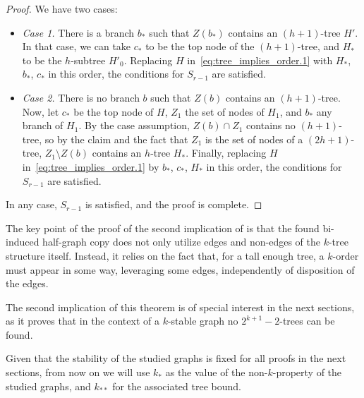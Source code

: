 \begin{theorem}
\begin{proof}
                We have two cases:
                \begin{itemize}
                    \item \emph{Case 1.} There is a branch $b_*$ such that $Z(b_*)$ contains an $(h+1)$-tree $H'$.
                        In that case, we can take $c_*$ to be the top node of the $(h+1)$-tree, and $H_*$ to be the
                        $h$-subtree $H'_0$.
                        Replacing $H$ in~\eqref{eq:tree_implies_order.1} with $H_*$, $b_*$, $c_*$ in this order, the
                        conditions for $S_{r-1}$ are satisfied.
                    \item \emph{Case 2.} There is no branch $b$ such that $Z(b)$ contains an $(h+1)$-tree.
                        Now, let $c_*$ be the top node of $H$, $Z_1$ the set of nodes of $H_1$, and
                        $b_*$ any branch of $H_1$.
                        By the case assumption, $Z(b) \cap Z_1$ contains no $(h+1)$-tree, so by the claim
                        and the fact that $Z_1$ is the set of nodes of a $(2h+1)$-tree,
                        $Z_1 \setminus Z(b)$ contains an $h$-tree $H_*$.
                        Finally, replacing $H$ in~\eqref{eq:tree_implies_order.1} by $b_*$, $c_*$, $H_*$ in this order, the
                        conditions for $S_{r-1}$ are satisfied.
                \end{itemize}
                In any case, $S_{r-1}$ is satisfied, and the proof is complete.
            \end{proof}
        \end{theorem}

        \begin{remark}
            The key point of the proof of the second implication of  is that the found
            bi-induced half-graph copy does not only utilize edges and non-edges of the $k$-tree structure itself.
            Instead, it relies on the fact that, for a tall enough tree, a $k$-order must appear in some way, leveraging
            some  edges, independently of disposition of the edges.
        \end{remark}

        The second implication of this theorem is of special interest in the next sections, as it proves that in the context
        of a $k$-stable graph no $2^{k+1}-2$-trees can be found.

        Given that the stability of the studied graphs is fixed for all proofs in the next sections, from now on we will use
        $k_*$ as the value of the non-$k$-property of the studied graphs, and $k_{**}$ for the associated tree bound.